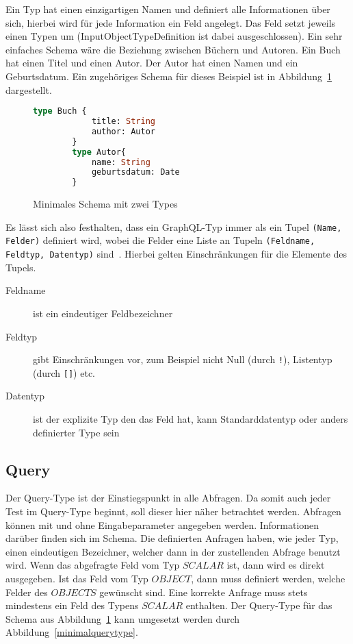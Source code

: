 Ein Typ hat einen einzigartigen Namen und definiert alle Informationen über sich, hierbei wird für jede Information ein Feld angelegt.
Das Feld setzt jeweils einen Typen um (InputObjectTypeDefinition ist dabei ausgeschlossen).
Ein sehr einfaches Schema wäre die Beziehung zwischen Büchern und Autoren.
Ein Buch hat einen Titel und einen Autor.
Der Autor hat einen Namen und ein Geburtsdatum.
Ein zugehöriges Schema für dieses Beispiel ist in Abbildung~\ref{buchauthorschema} dargestellt.

\begin{figure}[htb]
    \begin{center}
        \begin{lstlisting}[language=GraphQL]
        type Buch {
            title: String
            author: Autor
        }
        type Autor{
            name: String
            geburtsdatum: Date
        }
        \end{lstlisting}
    \end{center}
    \caption{Minimales Schema mit zwei Types}
    \label{buchauthorschema}
\end{figure}

Es lässt sich also festhalten, dass ein GraphQL-Typ immer als ein Tupel \verb+(Name, Felder)+ definiert wird, wobei
die Felder eine Liste an Tupeln \verb+(Feldname, Feldtyp, Datentyp)+ sind~\cite[vgl. 3.6 Objects]{graphqlspecification}.
Hierbei gelten Einschränkungen für die Elemente des Tupels.

\begin{center}
    \begin{description}
        \item[Feldname] ist ein eindeutiger Feldbezeichner
        \item[Feldtyp] gibt Einschränkungen vor, zum Beispiel nicht Null (durch \verb+!+), Listentyp (durch \verb+[]+) etc.
        \item[Datentyp] ist der explizite Typ den das Feld hat, kann Standarddatentyp oder anders definierter Type sein
    \end{description}
\end{center}

\subsection{Query}

Der Query-Type ist der Einstiegspunkt in alle Abfragen.
Da somit auch jeder Test im Query-Type beginnt, soll dieser hier näher betrachtet werden.
Abfragen können mit und ohne Eingabeparameter angegeben werden.
Informationen darüber finden sich im Schema.
Die definierten Anfragen haben, wie jeder Typ, einen eindeutigen Bezeichner, welcher dann in der zustellenden Abfrage benutzt wird.
Wenn das abgefragte Feld vom Typ $SCALAR$ ist, dann wird es direkt ausgegeben.
Ist das Feld vom Typ $OBJECT$, dann muss definiert werden, welche Felder des $OBJECTS$ gewünscht sind.
Eine korrekte Anfrage muss stets mindestens ein Feld des Typens $SCALAR$ enthalten.
Der Query-Type für das Schema aus Abbildung~\ref{buchauthorschema} kann umgesetzt werden durch Abbildung~\ref{minimalquerytype}.

